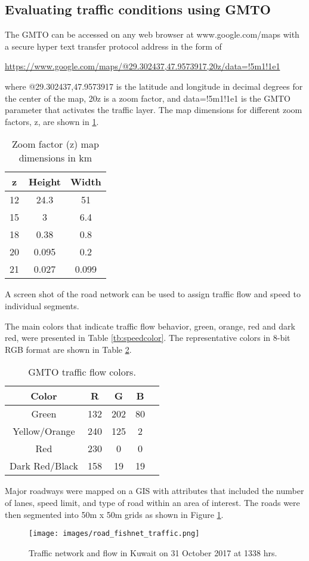 \subsection{Evaluating traffic conditions using GMTO}
The GMTO can be accessed on any web browser at www.google.com/maps with a secure hyper text transfer protocol address in the form of 

\url{https://www.google.com/maps/@29.302437,47.9573917,20z/data=!5m1!1e1}

\noindent
where @29.302437,47.9573917 is the latitude and longitude in decimal degrees for the center of the map, 20z is a zoom factor, and data=!5m1!1e1 is the GMTO parameter that activates the traffic layer. The map dimensions for different zoom factors, z, are shown in \ref{tb:zoomfactors}.

\begin{table}[]
\centering
\caption[Zoom factor map dimensions]{Zoom factor (z) map dimensions in km}
\label{tb:zoomfactors}
\begin{tabular}{@{}ccc@{}}
\toprule
\textbf{z} & \textbf{Height} & \textbf{Width} \\ \midrule
12 & 24.3 & 51 \\
15 & 3 & 6.4 \\
18 & 0.38 & 0.8 \\
20 & 0.095 & 0.2 \\
21 & 0.027 & 0.099 \\ \bottomrule
\end{tabular}
\end{table}

A screen shot of the road network can be used to assign traffic flow and speed to individual segments.

The main colors that indicate traffic flow behavior, green, orange, red and dark red, were presented in Table \ref{tb:speedcolor}. The representative colors in 8-bit RGB format are shown in Table \ref{tb:RGBcolor}. 
%
\begin{table}
\centering
\caption{GMTO traffic flow colors.}
\label{tb:RGBcolor}
\begin{tabular}{@{}ccccc@{}}
\toprule
\textbf{Color} & \textbf{R} & \textbf{G} & \textbf{B} \\ \midrule
Green & 132 & 202 & 80  \\
Yellow/Orange & 240 & 125 & 2 \\
Red & 230 & 0 & 0 \\
Dark Red/Black & 158 & 19 &19 \\ \bottomrule
\end{tabular}
\end{table}
%
Major roadways were mapped on a GIS with attributes that included the number of lanes, speed limit, and type of road within an area of interest.  The roads were then segmented into 50m x 50m grids as shown in Figure \ref{fig:gridtraffic}.
%
\begin{figure}
\texttt{[image: images/road\_fishnet\_traffic.png]} 
\caption[Traffic network and flow in Kuwait]{Traffic network and flow in Kuwait on 31 October 2017 at 1338 hrs.}
\label{fig:gridtraffic}
\end{figure}
%

